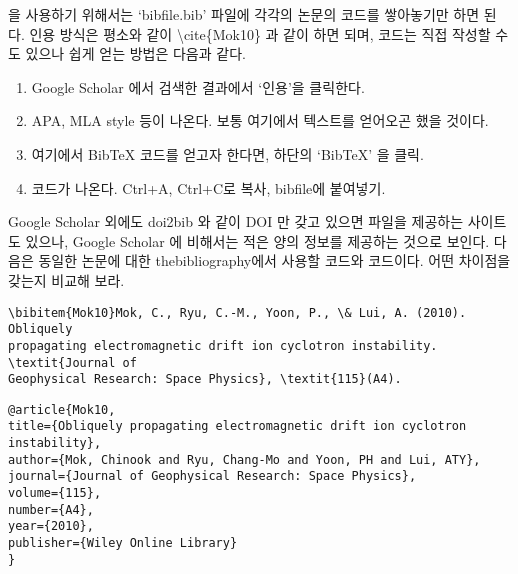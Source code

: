  을 사용하기 위해서는 `bibfile.bib' 파일에 각각의 논문의 코드를 
쌓아놓기만 하면 된다. 인용 방식은 평소와 같이 \textbackslash cite\{Mok10\} 과 
같이 하면 되며,  코드는 직접 작성할 수도 있으나 쉽게 얻는 방법은 
다음과 같다.
\begin{enumerate}
	\item Google Scholar 에서 검색한 결과에서 `인용'을 클릭한다.
	\item APA, MLA style 등이 나온다. 보통 여기에서 텍스트를 얻어오곤 했을 
	것이다.
	\item 여기에서 BibTeX 코드를 얻고자 한다면, 하단의 `BibTeX' 을 클릭.
	\item 코드가 나온다. Ctrl+A, Ctrl+C로 복사, bibfile에 붙여넣기.
\end{enumerate}
Google Scholar 외에도 doi2bib 와 같이 DOI 만 갖고 있으면  파일을 
제공하는 사이트도 있으나, Google Scholar 에 비해서는 적은 양의 정보를 제공하는 
것으로 보인다. 다음은 동일한 논문에 대한 thebibliography에서 사용할 코드와 
 코드이다. 어떤 차이점을 갖는지 비교해 보라.
\begin{lstlisting}[breaklines=false]
\bibitem{Mok10}Mok, C., Ryu, C.-M., Yoon, P., \& Lui, A. (2010). Obliquely 
propagating electromagnetic drift ion cyclotron instability. \textit{Journal of 
Geophysical Research: Space Physics}, \textit{115}(A4).
\end{lstlisting}

\begin{lstlisting}
@article{Mok10,
title={Obliquely propagating electromagnetic drift ion cyclotron instability},
author={Mok, Chinook and Ryu, Chang-Mo and Yoon, PH and Lui, ATY},
journal={Journal of Geophysical Research: Space Physics},
volume={115},
number={A4},
year={2010},
publisher={Wiley Online Library}
}
\end{lstlisting}
